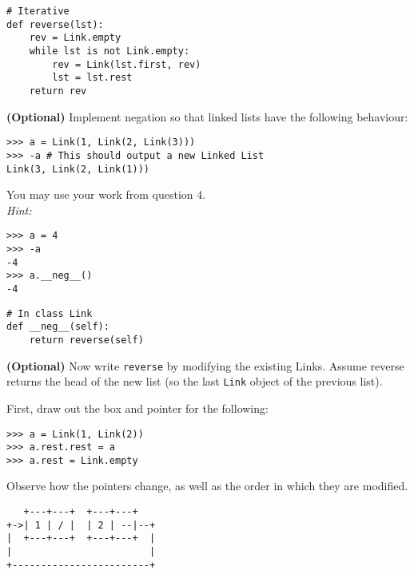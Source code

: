 \documentclass{exam}
\begin{document}
\begin{questions}
\begin{blocksection}
\begin{solution}[1in]
\begin{lstlisting}
# Iterative
def reverse(lst):
    rev = Link.empty
    while lst is not Link.empty:
        rev = Link(lst.first, rev)
        lst = lst.rest
    return rev
\end{lstlisting}
\end{solution}

\end{blocksection}

\begin{blocksection}
\question \textbf{(Optional)} Implement negation so that linked lists have the
following behaviour:

\begin{lstlisting}
>>> a = Link(1, Link(2, Link(3)))
>>> -a # This should output a new Linked List
Link(3, Link(2, Link(1)))
\end{lstlisting}

You may use your work from question 4.\\
\textit{Hint:}
\begin{lstlisting}
>>> a = 4
>>> -a
-4
>>> a.__neg__()
-4
\end{lstlisting}

\begin{solution}[0.3in]
\begin{lstlisting}
# In class Link
def __neg__(self):
    return reverse(self)
\end{lstlisting}
\end{solution}

\end{blocksection}

\begin{blocksection}
\question \textbf{(Optional)} Now write \texttt{reverse} by modifying the existing Links. Assume reverse returns the head of the new list (so the last \texttt{Link} object of the previous list).

First, draw out the box and pointer for the following:
\begin{lstlisting}
>>> a = Link(1, Link(2))
>>> a.rest.rest = a
>>> a.rest = Link.empty
\end{lstlisting}
Observe how the pointers change, as well as the order in which they are
modified.
\begin{solution}[0.6in]
\begin{lstlisting}
   +---+---+  +---+---+
+->| 1 | / |  | 2 | --|--+
|  +---+---+  +---+---+  |
|                        |
+------------------------+
\end{lstlisting}
\end{solution}
\end{blocksection}


\end{questions}
\end{document}
